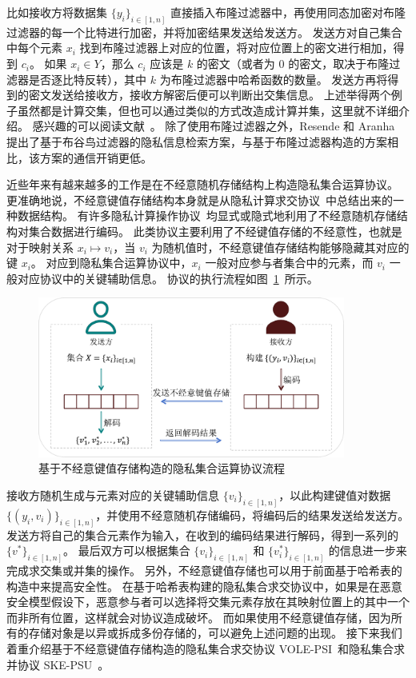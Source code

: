 比如接收方将数据集 $\{y_i\}_{i\in [1,n]}$ 直接插入布隆过滤器中，再使用同态加密对布隆过滤器的每一个比特进行加密，并将加密结果发送给发送方。
发送方对自己集合中每个元素 $x_i$ 找到布隆过滤器上对应的位置，将对应位置上的密文进行相加，得到 $c_i$。
如果 $x_i\in Y$，那么 $c_i$ 应该是 $k$ 的密文（或者为 $0$ 的密文，取决于布隆过滤器是否逐比特反转），其中 $k$ 为布隆过滤器中哈希函数的数量。
发送方再将得到的密文发送给接收方，接收方解密后便可以判断出交集信息。
上述举得两个例子虽然都是计算交集，但也可以通过类似的方式改造成计算并集，这里就不详细介绍。
感兴趣的可以阅读文献~\cite{davidson2017efficient,chen2024private}。
除了使用布隆过滤器之外，Resende 和 Aranha~\cite{resende2018faster} 提出了基于布谷鸟过滤器的隐私信息检索方案，与基于布隆过滤器构造的方案相比，该方案的通信开销更低。

近些年来有越来越多的工作是在不经意随机存储结构上构造隐私集合运算协议。
更准确地说，不经意键值存储结构本身就是从隐私计算求交协议~\cite{garimella2021oblivious}中总结出来的一种数据结构。
有许多隐私计算操作协议~\cite{kolesnikov2019scalable,garimella2021private,rindal2021volepsi,zhang2023linear}均显式或隐式地利用了不经意随机存储结构对集合数据进行编码。
此类协议主要利用了不经键值存储的不经意性，也就是对于映射关系 $x_i \mapsto v_i$，当 $v_i$ 为随机值时，不经意键值存储结构能够隐藏其对应的键 $x_i$。
对应到隐私集合运算协议中，$x_i$ 一般对应参与者集合中的元素，而 $v_i$ 一般对应协议中的关键辅助信息。
协议的执行流程如图~\ref{fig:pso_okvs}~所示。
\begin{figure}[ht]
  \centering
  \includegraphics[width=0.9\textwidth]{figures/pso_okvs.pdf}
  \caption{基于不经意键值存储构造的隐私集合运算协议流程}
  \label{fig:pso_okvs}
\end{figure}
接收方随机生成与元素对应的关键辅助信息 $\{v_i\}_{i\in [1,n]}$，以此构建键值对数据 $\{(y_i, v_i)\}_{i\in [1,n]}$，并使用不经意随机存储编码，将编码后的结果发送给发送方。
发送方将自己的集合元素作为输入，在收到的编码结果进行解码，得到一系列的 $\{v^*\}_{i\in [1,n]}$。
最后双方可以根据集合 $\{v_i\}_{i\in [1,n]}$ 和 $\{v_i^*\}_{i\in [1,n]}$ 的信息进一步来完成求交集或并集的操作。
另外，不经意键值存储也可以用于前面基于哈希表的构造中来提高安全性。
在基于哈希表构建的隐私集合求交协议中，如果是在恶意安全模型假设下，恶意参与者可以选择将交集元素存放在其映射位置上的其中一个而非所有位置，这样就会对协议造成破坏。
而如果使用不经意键值存储，因为所有的存储对象是以异或拆成多份存储的，可以避免上述问题的出现。
接下来我们着重介绍基于不经意键值存储构造的隐私集合求交协议 VOLE-PSI~\cite{rindal2021volepsi}和隐私集合求并协议 SKE-PSU~\cite{zhang2023linear}。

